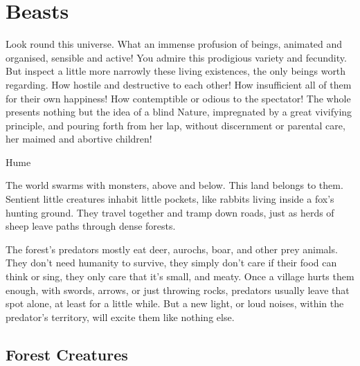 \chapter{Beasts}
\label{bestiary}

\epigraph{Look round this universe. What an immense profusion of beings, animated and organised, sensible and active! You admire this prodigious variety and fecundity. But inspect a little more narrowly these living existences, the only beings worth regarding. How hostile and destructive to each other! How insufficient all of them for their own happiness! How contemptible or odious to the spectator! The whole presents nothing but the idea of a blind Nature, impregnated by a great vivifying principle, and pouring forth from her lap, without discernment or parental care, her maimed and abortive children!}{Hume}


\noindent
The world swarms with monsters, above and below.
This land belongs to them.
Sentient little creatures inhabit little pockets, like rabbits living inside a fox's hunting ground.
They travel together and tramp down roads, just as herds of sheep leave paths through dense forests.

The forest's predators mostly eat deer, aurochs, boar, and other prey animals.
They don't need humanity to survive, they simply don't care if their food can think or sing, they only care that it's small, and meaty.
Once a village hurts them enough, with swords, arrows, or just throwing rocks, predators usually leave that spot alone, at least for a little while.
But a new light, or loud noises, within the predator's territory, will excite them like nothing else.

\section[Forest Creatures]{Forest Creatures \A}

